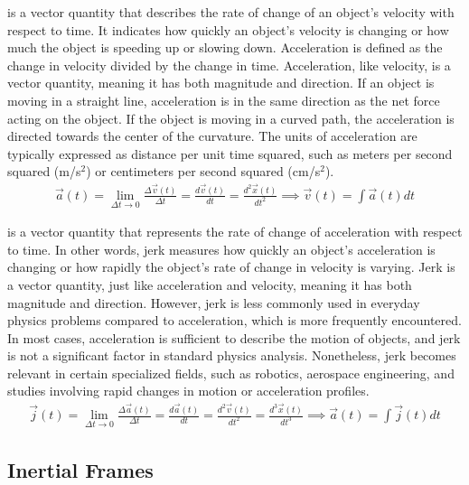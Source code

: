  is a vector quantity that describes the rate of change of an object's velocity with respect to time. It indicates how quickly an object's velocity is changing or how much the object is speeding up or slowing down. Acceleration is defined as the change in velocity divided by the change in time. Acceleration, like velocity, is a vector quantity, meaning it has both magnitude and direction. If an object is moving in a straight line, acceleration is in the same direction as the net force acting on the object. If the object is moving in a curved path, the acceleration is directed towards the center of the curvature. The units of acceleration are typically expressed as distance per unit time squared, such as meters per second squared (m/s$^2$) or centimeters per second squared (cm/s$^2$).
\begin{align}
\vec{a}(t)=\lim_{\Delta t \to 0}\frac{\Delta \vec{v}(t)}{\Delta t} = \frac{d\vec{v}(t)}{dt} = \frac{d^2\vec{x}(t)}{dt^2} \implies \vec{v}(t) = \int \vec{a}(t) dt
\end{align}

 is a vector quantity that represents the rate of change of acceleration with respect to time. In other words, jerk measures how quickly an object's acceleration is changing or how rapidly the object's rate of change in velocity is varying. Jerk is a vector quantity, just like acceleration and velocity, meaning it has both magnitude and direction. However, jerk is less commonly used in everyday physics problems compared to acceleration, which is more frequently encountered. In most cases, acceleration is sufficient to describe the motion of objects, and jerk is not a significant factor in standard physics analysis. Nonetheless, jerk becomes relevant in certain specialized fields, such as robotics, aerospace engineering, and studies involving rapid changes in motion or acceleration profiles.
\begin{align}
\vec{j}(t)=\lim_{\Delta t \to 0}\frac{\Delta \vec{a}(t)}{\Delta t} = \frac{d\vec{a}(t)}{dt} = \frac{d^2\vec{v}(t)}{dt^2} = \frac{d^3\vec{x}(t)}{dt^3} \implies \vec{a}(t) = \int \vec{j}(t) dt
\end{align}



\subsection{Inertial Frames}

